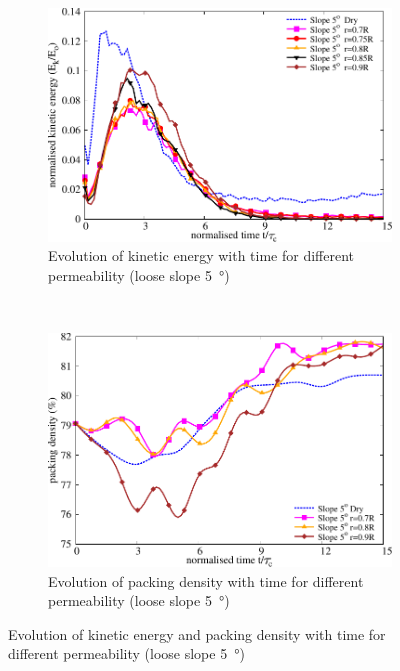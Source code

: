 \begin{figure}
\centering
\begin{subfigure}[b]{0.95\textwidth}
\includegraphics[width=0.95\columnwidth]{KE_loose_5_slope}
\caption{Evolution of kinetic energy with time for different permeability 
(loose slope \SI{5}{\degree})}
\label{fig:KE5}
\end{subfigure} \\
\begin{subfigure}[b]{0.95\textwidth}
\centering
\includegraphics[width=0.95\columnwidth]{Voronoi_5}
\caption{Evolution of packing density with time for different permeability 
(loose slope \SI{5}{\degree})}
\label{fig:voro5}
\end{subfigure}
\caption{Evolution of kinetic energy and packing density with time for 
different permeability 
(loose slope \SI{5}{\degree})}
\label{fig:voro_ke_5}
\end{figure}

